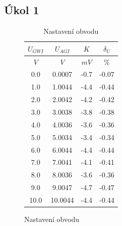\documentclass{article}
\begin{document}
\subsection*{Úkol 1}
\begin{figure}[H]
    \begin{minipage}[t]{0.4\textwidth}
        \begin{table}[H]
            \begin{tabular}{|c|c|c|c|}
            \hline
                \(U_{GWI}\)        &	\(U_{AGI}\)            &	\(K\)        & \(\delta_U\)       \\ \hline
                \(V\)              &    \(V\)                  &	\(mV\)              & \(\%\) \\ \hline
                 0.0               &    0.0007	               &    -0.7                & -0.07 \\ \hline
                 1.0               &    1.0044	               &    -4.4                & -0.44 \\ \hline
                 2.0               &    2.0042	               &    -4.2                & -0.42 \\ \hline
                 3.0               &    3.0038	               &    -3.8                & -0.38 \\ \hline
                 4.0               &    4.0036	               &    -3.6                & -0.36 \\ \hline
                 5.0               &    5.0034	               &    -3.4                & -0.34 \\ \hline
                 6.0               &    6.0044	               &    -4.4                & -0.44 \\ \hline
                 7.0               &    7.0041	               &    -4.1                & -0.41 \\ \hline
                 8.0               &    8.0036	               &    -3.6                & -0.36 \\ \hline
                 9.0               &    9.0047	               &    -4.7                & -0.47 \\ \hline
                10.0               &    10.0044                &	-4.4                & -0.44 \\ \hline
            \end{tabular}
            \caption{\label{tab_pracovni_bod} Nastavení obvodu}
        \end{table}

\end{minipage}
\end{figure}
\end{document}
